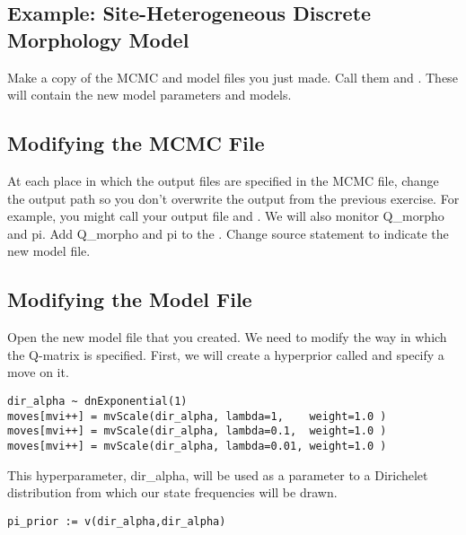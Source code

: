 \subsection{Example: Site-Heterogeneous Discrete Morphology Model }

{\begin{framed}
Make a copy of the MCMC and model files you just made. 
Call them  and . 
These will contain the new model parameters and models. \par 
\end{framed}}

\subsection{Modifying the MCMC File}

At each place in which the output files are specified in the MCMC file, change the output path so you don't overwrite the output from the previous exercise. 
For example, you might call your output file  and .
We will also monitor Q\_morpho and pi.
Add Q\_morpho and pi to the . 
Change source statement to indicate the new model file.

\subsection{Modifying the Model File}
Open the new model file that you created. We need to modify the way in which the Q-matrix is specified.
First, we will create a hyperprior called  and specify a move on it.
{\tt \begin{snugshade*}
\begin{lstlisting}
dir_alpha ~ dnExponential(1)
moves[mvi++] = mvScale(dir_alpha, lambda=1,    weight=1.0 )
moves[mvi++] = mvScale(dir_alpha, lambda=0.1,  weight=1.0 )
moves[mvi++] = mvScale(dir_alpha, lambda=0.01, weight=1.0 )
\end{lstlisting}
\end{snugshade*}}

This hyperparameter, dir\_alpha, will be used as a parameter to a Dirichelet distribution from which our state frequencies will be drawn.

{\tt \begin{snugshade*}
\begin{lstlisting}
pi_prior := v(dir_alpha,dir_alpha)
\end{lstlisting}
\end{snugshade*}}

